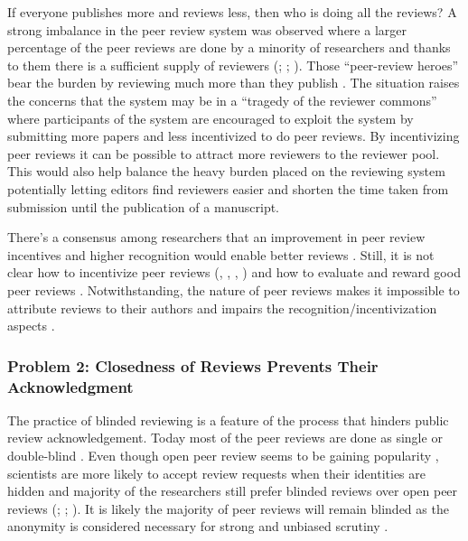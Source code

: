 If everyone publishes more and reviews less, then who is doing all the reviews? A strong imbalance in the peer review system was observed where a larger percentage of the peer reviews are done by a minority of researchers and thanks to them there is a sufficient supply of reviewers (\cite{Kovanis.2016}; \cite{Petchey.2014}; \cite[37]{Ware.2008}). Those “peer-review heroes” bear the burden by reviewing much more than they publish \parencite[9]{Kovanis.2016}. The situation raises the concerns that the system may be in a “tragedy of the reviewer commons” \parencite{Hochberg.2009} where participants of the system are encouraged to exploit the system by submitting more papers and less incentivized to do peer reviews. By incentivizing peer reviews it can be possible to attract more reviewers to the reviewer pool. This would also help balance the heavy burden placed on the reviewing system potentially letting editors find reviewers easier and shorten the time taken from submission until the publication of a manuscript. 

There’s a consensus among researchers that an improvement in peer review incentives and higher recognition would enable better reviews \parencite{Publons.2018}. Still, it is not clear how to incentivize peer reviews (\cite[28]{Ware.2008}, \cite{Warne.2016}, \cite{Gasparyan.2015}, \cite{Tite.2007}) and how to evaluate and reward good peer reviews \parencite[12]{Ferreira.2016}. Notwithstanding, the nature of peer reviews makes it impossible to attribute reviews to their authors and impairs the recognition/incentivization aspects \parencite[4]{Tennant.2018b}.

\subsubsection{Problem 2: Closedness of Reviews Prevents Their Acknowledgment}

The practice of blinded reviewing is a feature of the process that hinders public review acknowledgement. Today most of the peer reviews are done as single or double-blind \parencite{Wolfram.2020}. Even though open peer review seems to be gaining popularity \parencite{Wolfram.2020}, scientists are more likely to accept review requests when their identities are hidden \parencite{vanRooyen.1999} and majority of the researchers still prefer blinded reviews over open peer reviews (\cite[149]{Mulligan.2013}; \cite{Taylor&Francis.2015}; \cite[1038-1039]{Wolfram.2020}). It is likely the majority of peer reviews will remain blinded as the anonymity is considered necessary for strong and unbiased scrutiny \parencite[21-23]{RossHellauer.2017}.

